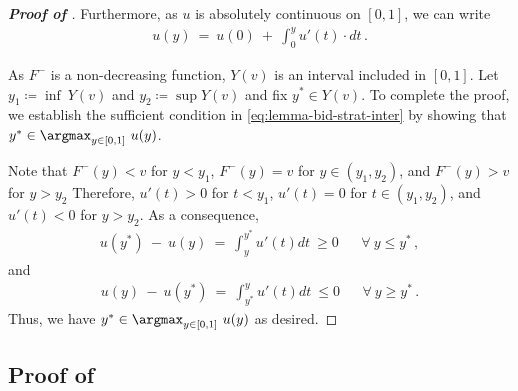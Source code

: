 \begin{proof}[\textbf{Proof of }]
    Furthermore, as $u$ is absolutely continuous on $[0,1]$, we can write
	\begin{align*}
		u(y)\ =\ u(0)\ +\ \int_0^y u'(t) \cdot dt\,.
	\end{align*}
	
    As $F^-$ is a non-decreasing function, $Y(v)$ is an interval included in $[0,1]$. Let $y_1 \coloneqq \inf\ Y(v)$ and $y_2 \coloneqq \sup Y(v)$ and fix $y^* \in Y(v)$. To complete the proof, we establish the sufficient condition in \eqref{eq:lemma-bid-strat-inter} by showing that $y^* \in \argmax_{y \in [0,1]}\ u(y)$. 
    
    Note that $F^-(y) < v$ for $y < y_1$, $F^-(y) = v$ for $y \in (y_1, y_2)$, and $F^-(y) > v$ for $y > y_2$ Therefore, $u'(t) > 0$ for $t < y_1$, $u'(t) = 0$ for $t \in (y_1, y_2)$, and $u'(t) < 0$ for $y > y_2$. As a consequence,
	\begin{align*}
		u(y^*)\ -\ u(y)\ =\ \int_{y}^{y^*} u'(t) dt\ \geq 0 &&\forall\ y \leq y^*\,,
	\end{align*}
	and
	\begin{align*}
		u(y)\ -\ u(y^*)\ =\ \int_{y^*}^{y} u'(t) dt\ \leq 0 &&\forall\ y \geq y^*\,.
	\end{align*}
	Thus, we have $y^* \in \argmax_{y \in [0,1]}\ u(y)$ as desired.
\end{proof}



\subsection{Proof of }

